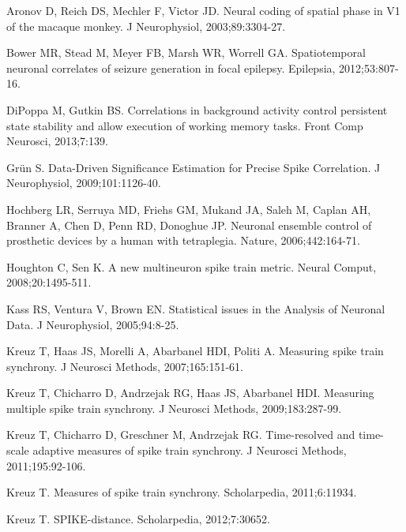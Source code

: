 \documentclass[10pt,twocolumn]{elsart5p}
\begin{document}
	\begin{thebibliography}{25}

Aronov D, Reich DS, Mechler F, Victor JD. Neural coding of spatial phase in V1 of the macaque monkey. J Neurophysiol, 2003;89:3304-27.

Bower MR, Stead M, Meyer FB, Marsh WR, Worrell GA. Spatiotemporal neuronal correlates of seizure generation in focal epilepsy. Epilepsia, 2012;53:807-16.

{DiPoppa} M, Gutkin BS. Correlations in background activity control persistent state stability and allow execution of working memory tasks. Front Comp Neurosci, 2013;7:139.

Gr{\"u}n S. Data-Driven Significance Estimation for Precise Spike Correlation. J Neurophysiol, 2009;101:1126-40.

Hochberg LR, Serruya MD, Friehs GM, Mukand JA, Saleh M, Caplan AH, Branner A, Chen D, Penn RD, Donoghue JP. Neuronal ensemble control of prosthetic devices by a human with tetraplegia. Nature, 2006;442:164-71.

Houghton C, Sen K. A new multineuron spike train metric. Neural Comput, 2008;20:1495-511.

Kass RS, Ventura V, Brown EN. Statistical issues in the Analysis of Neuronal Data. J Neurophysiol, 2005;94:8-25.

Kreuz T, Haas JS, Morelli A, Abarbanel HDI, Politi A. Measuring spike train synchrony. J Neurosci Methods, 2007;165:151-61.

Kreuz T, Chicharro D, Andrzejak RG, Haas JS, Abarbanel HDI. Measuring multiple spike train synchrony. J Neurosci Methods, 2009;183:287-99.

Kreuz T, Chicharro D, Greschner M, Andrzejak RG. Time-resolved and time-scale adaptive measures of spike train synchrony. J Neurosci Methods, 2011;195:92-106.

Kreuz T. Measures of spike train synchrony. Scholarpedia, 2011;6:11934.

Kreuz T. SPIKE-distance. Scholarpedia, 2012;7:30652.


\end{thebibliography}
\end{document}
